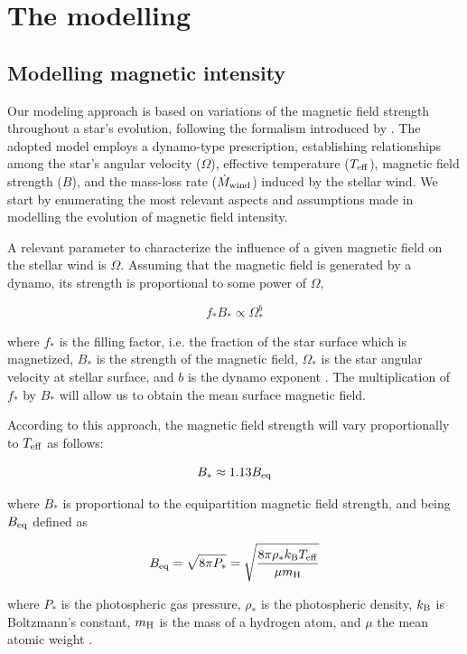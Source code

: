 \documentclass[fleqn,usenatbib]{mnras}
\begin{document}
\section{The modelling} \label{modelling}
\subsection{Modelling magnetic intensity} \label{mod_mbi}
Our modeling approach is based on variations of the magnetic field strength throughout a star's evolution, following the formalism introduced by \citet{Gallet2013}. The adopted model employs a dynamo-type prescription, establishing relationships among the star's angular velocity ($\Omega$), effective temperature ($T_{\mathrm{eff}}$), magnetic field strength ($B$), and the mass-loss rate ($\Dot{M}_{\mathrm{wind}}$) induced by the stellar wind. We start by enumerating the most relevant aspects and assumptions made in modelling the evolution of magnetic field intensity. \par 

A relevant parameter to characterize the influence of a given magnetic field on the stellar wind is $\Omega$. Assuming that the magnetic field is generated by a dynamo, its strength is proportional to some power of $\Omega$,
\begin{ceqn}
\begin{equation}
    f_*B_* \propto \Omega_*^b \label{eq:mf_strenght}
\end{equation}
\end{ceqn}
where $f_*$ is the filling factor, i.e. the fraction of the star surface which is magnetized, $B_*$ is the strength of the magnetic field, $\Omega_*$ is the star angular velocity at stellar surface, and $b$ is the dynamo exponent \citep{Gallet2013}. The multiplication of $f_*$ by $B_*$ will allow us to obtain the mean surface magnetic field. \par

According to this approach, the magnetic field strength will vary proportionally to $T_{\mathrm{eff}}$ as follows: 
\begin{ceqn}
\begin{equation}
    B_* \approx 1.13 B_{\mathrm{eq}} \label{eq:mf_bstar}
\end{equation}
\end{ceqn}
where $B_*$ is proportional to the equipartition magnetic field strength, and being $B_{\mathrm{eq}}$ defined as 
\begin{ceqn}
\begin{equation}
    B_{\mathrm{eq}} = \sqrt{8\pi P_*} = \sqrt{\frac{8\pi\rho_* k_{\mathrm{B}} T_{\mathrm{eff}}}{\mu m_{\mathrm{H}}}}\label{eq:mf_beq}    
\end{equation}
\end{ceqn}
where $P_*$ is the photospheric gas pressure, $\rho_*$ is the photospheric density, $k_{\mathrm{B}}$ is Boltzmann's constant, $m_{\mathrm{H}}$ is the mass of a hydrogen atom, and $\mu$ the mean atomic weight \citep{Cranmer2011}.
\end{document}

